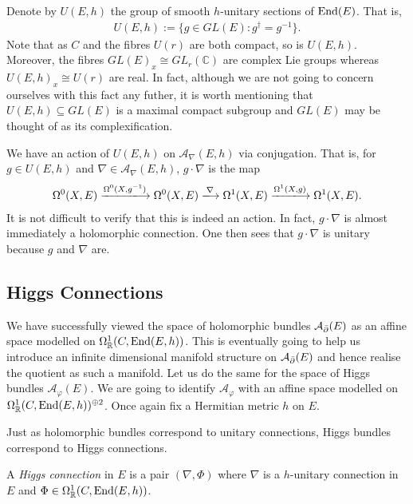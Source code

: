 \documentclass[12pt]{ociamthesis}  %
\begin{document}
Denote by $U(E,h)$ the group of smooth $h$-unitary sections of $\operatorname{End}(E)$.
That is,
\begin{align*}
  U(E,h) := \{g \in GL(E) : g^\dagger = g^{-1}\}.
\end{align*}
Note that as $C$ and the fibres $U(r)$ are both compact,
so is $U(E,h)$. Moreover, the fibres $GL(E)_x \cong GL_r(\mathbb C)$
are complex Lie groups whereas $U(E,h)_x\cong U(r)$ are real.
In fact, although we are not going to concern ourselves with this
fact any futher, it is worth mentioning that $U(E,h)\subseteq GL(E)$
is a maximal compact subgroup and $GL(E)$ may be thought of as its
complexification.

We have an action of $U(E,h)$ on $\mathcal A_\nabla(E,h)$ via conjugation. That is,
for $g\in U(E,h)$ and $\nabla\in \mathcal A_\nabla(E,h)$, $g\cdot\nabla$ is the map
\begin{align*}
  \Omega^0(X,E) \xlongrightarrow{\Omega^0(X,{g}^{-1})}
  \Omega^0(X,E) \xlongrightarrow{\nabla}
  \Omega^1(X,E) \xlongrightarrow{\Omega^1(X,g)}
  \Omega^1(X,E).
\end{align*}
It is not difficult to verify that this is indeed an action.
In fact, $g\cdot\nabla$ is almost immediately a holomorphic connection.
One then sees that $g\cdot\nabla$ is unitary because
$g$ and $\nabla$ are.


\subsection{Higgs Connections}

We have successfully viewed the space of holomorphic bundles
$\mathcal A_{\bar{\partial}} (E)$ as an affine space modelled on
$\Omega^1_{\mathbb{R}}(C,\operatorname{End}(E,h))$. This is eventually going
to help us introduce an infinite dimensional manifold structure on
$\mathcal A_{\bar{\partial}} (E)$ and hence realise the quotient as such a manifold.
Let us do the same for the space of Higgs
bundles $\mathcal A_\varphi(E)$. We are going to identify $\mathcal A_\varphi$ with an affine
space modelled on $\Omega^1_{\mathbb{R}}(C,\operatorname{End}(E,h))^{\oplus 2}$.
Once again fix a Hermitian metric $h$ on $E$.

Just as holomorphic bundles correspond to unitary connections, Higgs bundles
correspond to Higgs connections.

\begin{definition}
  A \emph{Higgs connection} in $E$ is a pair $(\nabla,\Phi)$
  where $\nabla$ is a $h$-unitary connection in $E$ and
  $\Phi\in\Omega^1_{\mathbb{R}}(C,\operatorname{End}(E,h))$.
\end{definition}
\end{document}
